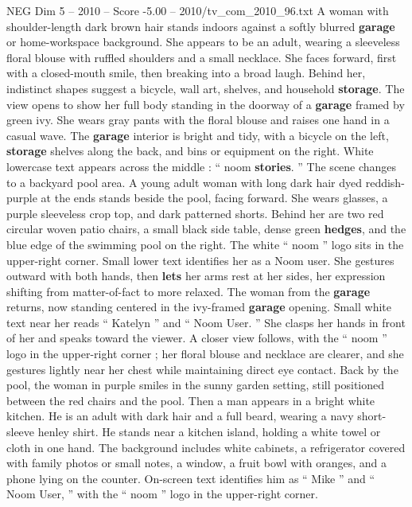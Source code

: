 \begin{textsample}{NEG Dim 5 – 2010 – Score -5.00 – 2010/tv\_com\_2010\_96.txt}  \label{ex:f5_neg_053}
A woman with shoulder-length dark brown hair stands indoors against a softly blurred \textbf{garage} or home-workspace background.
She appears to be an adult, wearing a sleeveless floral blouse with ruffled shoulders and a small necklace.
She faces forward, first with a closed-mouth smile, then breaking into a broad laugh.
Behind her, indistinct shapes suggest a bicycle, wall art, shelves, and household \textbf{storage}.
The view opens to show her full body standing in the doorway of a \textbf{garage} framed by green ivy.
She wears gray pants with the floral blouse and raises one hand in a casual wave.
The \textbf{garage} interior is bright and tidy, with a bicycle on the left, \textbf{storage} shelves along the back, and bins or equipment on the right.
White lowercase text appears across the middle : “ noom \textbf{stories}. ” The scene changes to a backyard pool area.
A young adult woman with long dark hair dyed reddish-purple at the ends stands beside the pool, facing forward.
She wears glasses, a purple sleeveless crop top, and dark patterned shorts.
Behind her are two red circular woven patio chairs, a small black side table, dense green \textbf{hedges}, and the blue edge of the swimming pool on the right.
The white “ noom ” logo sits in the upper-right corner.
Small lower text identifies her as a Noom user.
She gestures outward with both hands, then \textbf{lets} her arms rest at her sides, her expression shifting from matter-of-fact to more relaxed.
The woman from the \textbf{garage} returns, now standing centered in the ivy-framed \textbf{garage} opening.
Small white text near her reads “ Katelyn ” and “ Noom User. ” She clasps her hands in front of her and speaks toward the viewer.
A closer view follows, with the “ noom ” logo in the upper-right corner ; her floral blouse and necklace are clearer, and she gestures lightly near her chest while maintaining direct eye contact.
Back by the pool, the woman in purple smiles in the sunny garden setting, still positioned between the red chairs and the pool.
Then a man appears in a bright white kitchen.
He is an adult with dark hair and a full beard, wearing a navy short-sleeve henley shirt.
He stands near a kitchen island, holding a white towel or cloth in one hand.
The background includes white cabinets, a refrigerator covered with family photos or small notes, a window, a fruit bowl with oranges, and a phone lying on the counter.
On-screen text identifies him as “ Mike ” and “ Noom User, ” with the “ noom ” logo in the upper-right corner.

\end{textsample}
